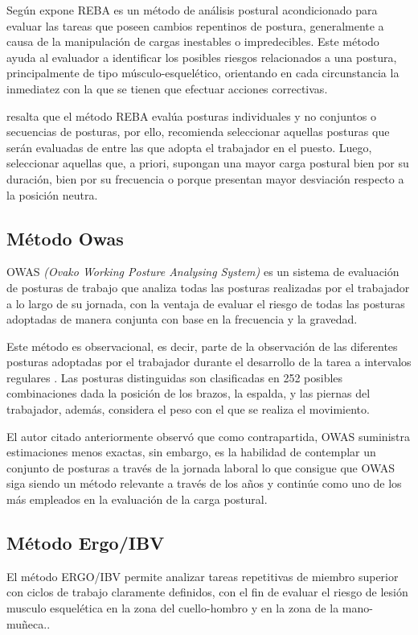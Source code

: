 Según expone \parencite{Hignett2000RapidREBA} REBA es un método de análisis postural acondicionado para evaluar las tareas que poseen cambios repentinos de postura, generalmente a causa de la manipulación de cargas inestables o impredecibles. Este método ayuda al evaluador a identificar los posibles riesgos relacionados a una postura, principalmente de tipo músculo-esquelético, orientando en cada circunstancia la inmediatez con la que se tienen que efectuar acciones correctivas.

\parencite{Diego-Mas2015EvaluacionREBA} resalta que el método REBA evalúa posturas individuales y no conjuntos o secuencias de posturas, por ello, recomienda seleccionar aquellas posturas que serán evaluadas de entre las que adopta el trabajador en el puesto. Luego, seleccionar aquellas que, a priori, supongan una mayor carga postural bien por su duración, bien por su frecuencia o porque presentan mayor desviación respecto a la posición neutra.
\subsection{Método Owas}
OWAS \textit{(Ovako Working Posture Analysing System)} es un sistema de evaluación de posturas de trabajo que analiza todas las posturas realizadas por el trabajador a lo largo de su jornada, con la ventaja de evaluar el riesgo de todas las posturas adoptadas de manera conjunta con base en la frecuencia y la gravedad.\parencite{MattilaMVilkki1999OccupationalSystems}

Este método es observacional, es decir, parte de la observación de las diferentes posturas adoptadas por el trabajador durante el desarrollo de la tarea a intervalos regulares \parencite{Diego-Mas2015EvaluacionOWAS}. Las posturas distinguidas son clasificadas en 252 posibles combinaciones dada la posición de los brazos, la espalda, y las piernas del trabajador, además, considera el peso con el que se realiza el movimiento. 

El autor citado anteriormente observó que como contrapartida, OWAS suministra estimaciones menos exactas, sin embargo, es la habilidad de contemplar un conjunto de posturas a través de la jornada laboral lo que consigue que OWAS siga siendo un método relevante a través de los años y continúe como uno de los más empleados en la evaluación de la carga postural.
\subsection{Método Ergo/IBV}
El método ERGO/IBV permite analizar tareas repetitivas de miembro superior con ciclos de trabajo claramente definidos, con el fin de evaluar el riesgo de lesión musculo esquelética en la zona del cuello-hombro y en la zona de la mano-muñeca.\parencite{Nogareda2009TareasErgonomicos}.

